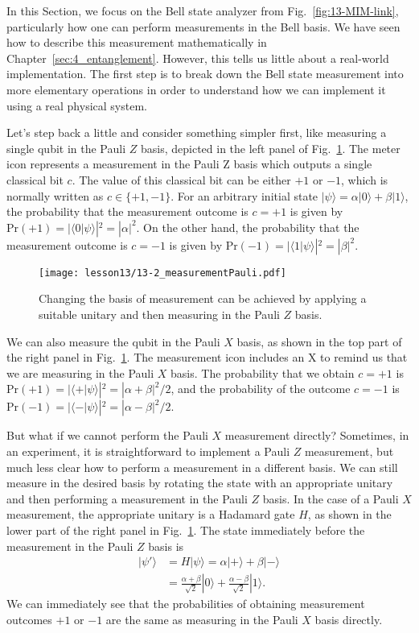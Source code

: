In this Section, we focus on the Bell state analyzer from Fig.~\ref{fig:13-MIM-link}, particularly how one can perform measurements in the Bell basis.
We have seen how to describe this measurement mathematically in Chapter~\ref{sec:4_entanglement}.
However, this tells us little about a real-world implementation.
The first step is to break down the Bell state measurement into more elementary operations in order to understand how we can implement it using a real physical system.

Let's step back a little and consider something simpler first, like measuring a single qubit in the Pauli $Z$ basis, depicted in the left panel of Fig.~\ref{fig:13-2_measurementPauli}.
The meter icon represents a measurement in the Pauli Z basis which outputs a single classical bit $c$.
The value of this classical bit can be either $+1$ or $-1$, which is normally written as $c\in\{+1,-1\}$.
For an arbitrary initial state $|\psi\rangle = \alpha |0\rangle + \beta |1\rangle$, the probability that the measurement outcome is $c=+1$ is given by $\text{Pr}(+1)=|\langle0|\psi\rangle|^2=|\alpha|^2$.
On the other hand, the probability that the measurement outcome is $c=-1$ is given by $\text{Pr}(-1)=|\langle1|\psi\rangle|^2=|\beta|^2$.

\begin{figure}[t]
    \centering
    \texttt{[image: lesson13/13-2\_measurementPauli.pdf]}
    \caption[Changing the basis of measurements.]{Changing the basis of measurement can be achieved by applying a suitable unitary and then measuring in the Pauli $Z$ basis.}
    \label{fig:13-2_measurementPauli}
\end{figure}

We can also measure the qubit in the Pauli $X$ basis, as shown in the top part of the right panel in Fig.~\ref{fig:13-2_measurementPauli}.
The measurement icon includes an X to remind us that we are measuring in the Pauli $X$ basis.
The probability that we obtain $c=+1$ is $\text{Pr}(+1)=|\langle+|\psi\rangle|^2=|\alpha+\beta|^2/2$, and the probability of the outcome $c=-1$ is $\text{Pr}(-1)=|\langle-|\psi\rangle|^2=|\alpha-\beta|^2/2$.

But what if we cannot perform the Pauli $X$ measurement directly?
Sometimes, in an experiment, it is straightforward to implement a Pauli $Z$ measurement, but much less clear how to perform a measurement in a different basis.
We can still measure in the desired basis by rotating the state with an appropriate unitary and then performing a measurement in the Pauli $Z$ basis.
In the case of a Pauli $X$ measurement, the appropriate unitary is a Hadamard gate $H$, as shown in the lower part of the right panel in Fig.~\ref{fig:13-2_measurementPauli}.
The state immediately before the measurement in the Pauli $Z$ basis is
\begin{align}
    |\psi'\rangle & = H|\psi\rangle = \alpha |+\rangle + \beta |-\rangle \nonumber\\
    & = \frac{\alpha + \beta}{\sqrt{2}} |0\rangle + \frac{\alpha - \beta}{\sqrt{2}} |1\rangle.
\end{align}
We can immediately see that the probabilities of obtaining measurement outcomes $+1$ or $-1$ are the same as measuring in the Pauli $X$ basis directly.


